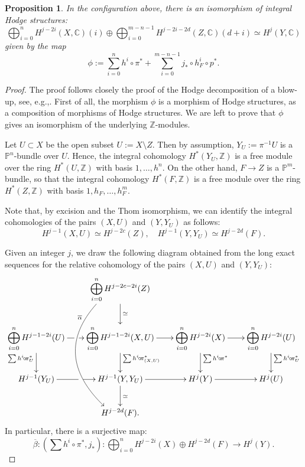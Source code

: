 \documentclass[11pt]{article}
\newcommand{\eg}{e.g.,\xspace}
\let\dpl\displaystyle
\theoremstyle{plain}
\newtheorem{prop}[theorem]{Proposition}
\theoremstyle{definition}
\newcommand{\ZZ}{\mathbb{Z}}
\newcommand{\CC}{\mathbb{C}}
\newcommand{\PP}{\mathbb{P}}
\begin{document}
\begin{prop}\label{prop:main-Hdg-deco}
In the configuration above, there is an isomorphism of integral Hodge structures:
\[
\bigoplus_{i=0}^n H^{j-2i}(X,\CC)(i) \oplus \bigoplus_{i=0}^{m-n-1} H^{j-2i-2d}(Z,\CC)(d+i) \simeq H^j(Y,\CC) 
\]
given by the map
\[
\phi:=\sum_{i=0}^n h^i \circ \pi^* + \sum_{i=0}^{m-n-1} j_* \circ h_F^i \circ p^*.
\]
\end{prop}
\begin{proof}
The proof follows closely the proof of the Hodge decomposition of a blow-up, see, \eg \cite[7.3.3]{voisin-book}.
First of all, the morphism $\phi$ is a morphism of Hodge structures, as a composition of morphisms of
Hodge structures. We are left to prove that $\phi$ gives an isomorphism of the underlying $\ZZ$-modules.

Let $U \subset X$ be the open subset $U:=X \setminus Z$. Then by assumption, $Y_U:=\pi^{-1} U$
is a $\PP^n$-bundle over $U$. Hence, the integral cohomology $H^*(Y_U,\ZZ)$ is a free module over the ring
$H^*(U,\ZZ)$ with basis $1,\ldots,h^n$.
On the other hand, $F \to Z$ is a $\PP^m$-bundle, so that the integral cohomology $H^*(F,\ZZ)$
is a free module over the ring $H^*(Z,\ZZ)$ with basis $1,h_F,\ldots,h_F^m$.

Note that, by excision and the Thom isomorphism, we can identify the integral cohomologies of the pairs $(X,U)$
and $(Y,Y_U)$ as follows:\vspace*{-3pt}\enlargethispage{\baselineskip}%
\begin{equation*}\label{eq:thom}
H^{j-1} (X,U) \simeq H^{j-2c}(Z), \quad H^{j-1}(Y,Y_U) \simeq H^{j-2d}(F).
\end{equation*}

Given an integer $j$, we draw the following diagram obtained from the long exact sequences for the
relative cohomology of the pairs $(X,U)$ and $(Y,Y_U)$:
\begin{equation*}
\xymatrix@C=.7cm{
& \dpl\bigoplus_{i=0}^n H^{j-2c-2i}(Z) \ar[d]^{\simeq} \ar@/_3.7pc/@<-2.3ex>[ddd]_(.25){\overline{\alpha}} & &\\
\dpl\bigoplus_{i=0}^n H^{j-1-2i}(U) \ar[d]_{\sum h^i \!\circ\! \pi_U^* } \ar[r]|(.48)\hole & \dpl\bigoplus_{i=0}^n H^{j-1-2i} (X,U) \ar[d]^{\sum h^i \!\circ\! \pi_{(X,U)}^*} \ar[r] & \dpl\bigoplus_{i=0}^n H^{j-2i}(X) \ar[d]^{\sum h^i \!\circ\! \pi^*} \ar[r] &
\dpl\bigoplus_{i=0}^n H^{j-2i}(U) \ar[d]^{\sum h^i \!\circ\! \pi_U^*} \\
H^{j-1}(Y_U) \ar[r]|(.53)\hole & H^{j-1} (Y,Y_U) \ar[d]^{\simeq} \ar[r] & H^j(Y) \ar[r] & H^j(U)\\
& H^{j-2d}(F).& &
}
\end{equation*}
In particular, there is a surjective map:
\[
\overline{\beta}:(\sum h^i \circ \pi^*, j_*): \bigoplus_{i=0}^n H^{j-2i}(X) \oplus H^{j-2d}(F) \to H^j(Y).
\]


\end{proof}
\end{document}
